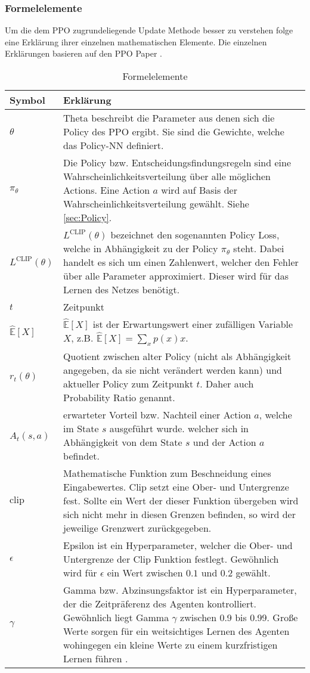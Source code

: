 \subsubsection{Formelelemente}
Um die dem PPO zugrundeliegende Update Methode besser zu verstehen folge eine Erklärung ihrer einzelnen mathematischen Elemente.
Die einzelnen Erklärungen basieren auf den PPO Paper \cite{PPO}.
\begin{longtable}[h]{|p{4cm}|p{\linewidth - 5cm}|}
	\caption{Formelelemente}
	\label{tab:FormelelementePPO} 
	\endfirsthead
	\endhead
	\hline
	Symbol & Erklärung \\
	\hline
	$\theta$ & Theta beschreibt die Parameter aus denen sich die Policy des PPO ergibt. Sie sind die Gewichte, welche das Policy-NN definiert. \\
	\hline
	$\pi_{\theta}$ & Die Policy bzw. Entscheidungsfindungsregeln sind eine Wahrscheinlichkeitsverteilung über alle möglichen Actions. Eine Action $a$ wird auf Basis der Wahrscheinlichkeitsverteilung gewählt. Siehe \ref{sec:Policy}. \cite[Summary of Notation S. xvi]{Sutton1998} \\
	\hline
	$L^\text{CLIP} (\theta)$ & $L^\text{CLIP} (\theta)$ bezeichnet den sogenannten Policy Loss, welche in Abhängigkeit zu der Policy $\pi_{\theta}$ steht. Dabei handelt es sich um einen Zahlenwert, welcher den Fehler über alle Parameter approximiert. Dieser wird für das Lernen des Netzes benötigt. \\
	\hline
	$t$ & Zeitpunkt \\
	\hline
	$\mathbb{\hat{E}}[X]$ & $\mathbb{\hat{E}}[X]$ ist der Erwartungswert einer zufälligen Variable $X$, z.B. $\mathbb{\hat{E}}[X] = \sum_{x}p(x)x$. \cite[Summary of Notation S. xv]{Sutton1998} \\
	\hline
	$r_{t}(\theta)$ & Quotient zwischen alter Policy (nicht als Abhängigkeit angegeben, da sie nicht verändert werden kann) und aktueller Policy zum Zeitpunkt $t$. Daher auch Probability Ratio genannt. \\
	\hline
	$\hat{A}_{t}(s, a)$ & erwarteter Vorteil bzw. Nachteil einer Action $a$, welche im State $s$ ausgeführt wurde. welcher sich in Abhängigkeit von dem State $s$ und der Action $a$ befindet. \\
	\hline
	$\text{clip}$ & Mathematische Funktion zum Beschneidung eines Eingabewertes. Clip setzt eine Ober- und Untergrenze fest. Sollte ein Wert der dieser Funktion übergeben wird sich nicht mehr in diesen Grenzen befinden, so wird der jeweilige Grenzwert zurückgegeben. \\
	\hline
	$\epsilon$ & Epsilon ist ein Hyperparameter, welcher die Ober- und Untergrenze der Clip Funktion festlegt. Gewöhnlich wird für $\epsilon$ ein Wert zwischen $0.1$ und $0.2$ gewählt. \\
	\hline
	$\gamma$ & Gamma bzw. Abzinsungsfaktor ist ein Hyperparameter, der die Zeitpräferenz des Agenten kontrolliert. Gewöhnlich liegt Gamma $\gamma$ zwischen 0.9 bis 0.99. Große Werte sorgen für ein weitsichtiges Lernen des Agenten wohingegen ein kleine Werte zu einem kurzfristigen Lernen führen \cite[S. 43 bzw. Summary of Notation S. xv]{Sutton1998}. \\
	\hline
\end{longtable}

